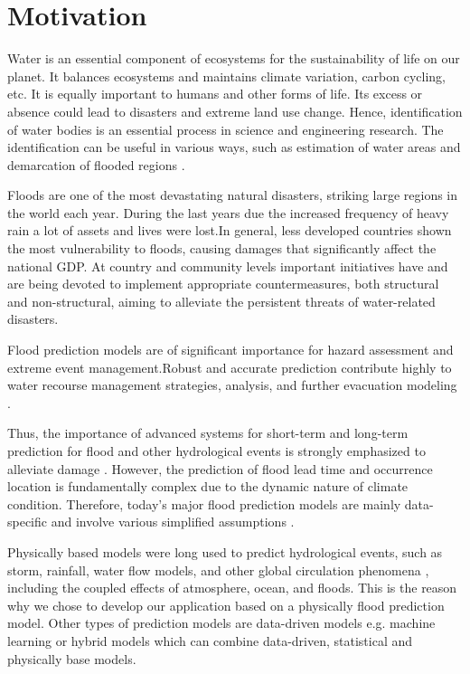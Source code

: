 \documentclass[12pt, a4paper]{report}
\begin{document}
\section{Motivation}
\quad
Water is an essential component of ecosystems for the sustainability of life on our planet. It balances ecosystems and maintains climate variation, carbon cycling, etc. It is equally important to humans and other forms of life. Its excess or absence could lead to disasters and extreme land use change. Hence, identification of water bodies is an essential process in science and engineering research. The identification can be useful in various ways, such as estimation of water areas and demarcation of flooded regions \cite {Rover, Alsdorf}.
\par 

Floods are one of the most devastating natural disasters, striking large regions in the world each year. During the last years due the increased frequency of heavy rain a lot of assets and lives were lost.In general, less developed countries shown the most vulnerability to floods, causing damages that significantly affect the national GDP. At country and community levels important initiatives have and are being devoted to implement appropriate countermeasures, both structural and non-structural, aiming to alleviate the persistent threats of water-related disasters. \cite{Flood-forecasting} 
\par

Flood prediction models are of significant importance for hazard assessment and extreme event management.Robust and accurate prediction contribute highly to water recourse management strategies, analysis, and further evacuation modeling \cite{Xie}.
\par

Thus, the importance of advanced systems for short-term and long-term prediction for flood and other hydrological events is strongly emphasized to alleviate damage \cite{Pitt}. However, the prediction of flood lead time and occurrence location is fundamentally complex due to the dynamic nature of climate condition. Therefore, today’s major flood prediction models are mainly data-specific and involve various simplified assumptions \cite{Lohani}. 
\par

Physically based models were long used to predict hydrological events, such as storm, rainfall, water flow models, and other global circulation phenomena , including the coupled effects of atmosphere, ocean, and floods. This is the reason why we chose to develop our application based on a physically flood prediction model. Other types of prediction models are data-driven models e.g. machine learning or hybrid models which can combine data-driven, statistical and physically base models.
\par 
\end{document}

